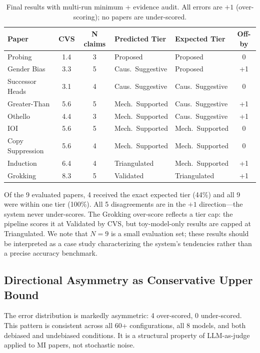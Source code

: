 \documentclass[10pt]{article}
\newcommand{\tighttable}{\setlength{\tabcolsep}{4pt}\renewcommand{\arraystretch}{1.05}}
\begin{document}
\begin{table}[t]
\centering
\tighttable
\caption{Final results with multi-run minimum + evidence audit. All errors are $+1$ (over-scoring); no papers are under-scored.}
\label{tab:results}
\small
\begin{tabular}{@{}lccllc@{}}
\toprule
\textbf{Paper} & \textbf{CVS} & \textbf{N claims} & \textbf{Predicted Tier} & \textbf{Expected Tier} & \textbf{Off-by} \\
\midrule
Probing & 1.4 & 3 & Proposed & Proposed & 0 \\
Gender Bias & 3.3 & 5 & Caus.\ Suggestive & Proposed & +1 \\
Successor Heads & 3.1 & 4 & Caus.\ Suggestive & Caus.\ Suggestive & 0 \\
Greater-Than & 5.6 & 5 & Mech.\ Supported & Caus.\ Suggestive & +1 \\
Othello & 4.4 & 3 & Mech.\ Supported & Caus.\ Suggestive & +1 \\
IOI & 5.6 & 5 & Mech.\ Supported & Mech.\ Supported & 0 \\
Copy Suppression & 5.6 & 4 & Mech.\ Supported & Mech.\ Supported & 0 \\
Induction & 6.4 & 4 & Triangulated & Mech.\ Supported & +1 \\
Grokking & 8.3 & 5 & Validated & Triangulated & +1 \\
\bottomrule
\end{tabular}
\end{table}

Of the 9 evaluated papers, 4 received the exact expected tier (44\%) and all 9 were within one tier (100\%). All 5 disagreements are in the $+1$ direction---the system never under-scores. The Grokking over-score reflects a tier cap: the pipeline scores it at Validated by CVS, but toy-model-only results are capped at Triangulated. We note that $N=9$ is a small evaluation set; these results should be interpreted as a case study characterizing the system's tendencies rather than a precise accuracy benchmark.

\subsection{Directional Asymmetry as Conservative Upper Bound}

The error distribution is markedly asymmetric: 4 over-scored, 0 under-scored. This pattern is consistent across all 60+ configurations, all 8 models, and both debiased and undebiased conditions. It is a structural property of LLM-as-judge applied to MI papers, not stochastic noise.
\end{document}
